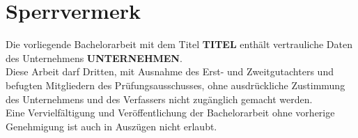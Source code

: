 \section*{Sperrvermerk}
Die vorliegende Bachelorarbeit mit dem Titel \textbf{TITEL} enthält vertrauliche Daten des Unternehmens \textbf{UNTERNEHMEN}.\\

Diese Arbeit darf Dritten, mit Ausnahme des Erst- und Zweitgutachters und befugten Mitgliedern des Prüfungsausschusses, ohne ausdrückliche Zustimmung des Unternehmens und des Verfassers nicht zugänglich gemacht werden.\\

Eine Vervielfältigung und Veröffentlichung der Bachelorarbeit ohne vorherige Genehmigung ist auch in Auszügen nicht erlaubt. 